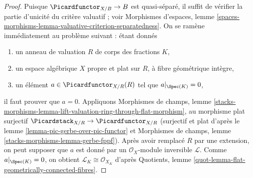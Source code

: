 \begin{proof}
Puisque $\Picardfunctor_{X/B} \to B$ est quasi-séparé, il suffit de
vérifier la partie d'unicité du critère valuatif ; voir Morphismes
d'espaces, lemme
\ref{spaces-morphisms-lemma-valuative-criterion-separatedness}.
On se ramène immédiatement au problème suivant : étant donnés
\begin{enumerate}
\item un anneau de valuation $R$ de corps des fractions $K$,
\item un espace algébrique $X$ propre et plat sur $R$, à fibre géométrique
intègre,
\item un élément $a \in \Picardfunctor_{X/R}(R)$ tel que
$a|_{\Spec(K)} = 0$,
\end{enumerate}
il faut prouver que $a = 0$. Appliquons Morphismes de champs, lemme
\ref{stacks-morphisms-lemma-lift-valuation-ring-through-flat-morphism},
au morphisme plat surjectif
$\Picardstack_{X/R} \to \Picardfunctor_{X/R}$
(surjectif et plat d'après le lemme
\ref{lemma-pic-gerbe-over-pic-functor} et Morphismes de champs, lemme
\ref{stacks-morphisms-lemma-gerbe-fppf}). Après avoir remplacé $R$ par une
extension, on peut supposer que $a$ est donné par un
$\mathcal{O}_X$-module inversible $\mathcal{L}$.
Comme $a|_{\Spec(K)} = 0$, on obtient
$\mathcal{L}_K \cong \mathcal{O}_{X_K}$ d'après Quotients, lemme
\ref{quot-lemma-flat-geometrically-connected-fibres}.


\end{proof}
